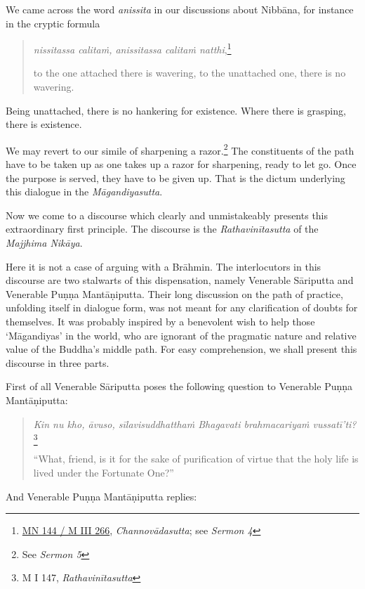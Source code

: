 We came across the word \emph{anissita} in our discussions about Nibbāna, for instance in the cryptic formula

\begin{quote}
\emph{nissitassa calitaṁ, anissitassa calitaṁ natthi},\footnote{\href{https://suttacentral.net/mn144/pli/ms}{MN 144 / M III 266}, \emph{Channovādasutta}; see \emph{Sermon 4}}

to the one attached there is wavering, to the unattached one, there is no wavering.
\end{quote}

Being unattached, there is no hankering for existence. Where there is grasping, there is existence.

We may revert to our simile of sharpening a razor.\footnote{See \emph{Sermon 5}} The constituents of the path have to be taken up as one takes up a razor for sharpening, ready to let go. Once the purpose is served, they have to be given up. That is the dictum underlying this dialogue in the \emph{Māgandiyasutta}.

Now we come to a discourse which clearly and unmistakeably presents this extraordinary first principle. The discourse is the \emph{Rathavinītasutta} of the \emph{Majjhima Nikāya}.

Here it is not a case of arguing with a Brāhmin. The interlocutors in this discourse are two stalwarts of this dispensation, namely Venerable Sāriputta and Venerable Puṇṇa Mantāṇiputta. Their long discussion on the path of practice, unfolding itself in dialogue form, was not meant for any clarification of doubts for themselves. It was probably inspired by a benevolent wish to help those `Māgandiyas' in the world, who are ignorant of the pragmatic nature and relative value of the Buddha's middle path. For easy comprehension, we shall present this discourse in three parts.

First of all Venerable Sāriputta poses the following question to Venerable Puṇṇa Mantāṇiputta:

\begin{quote}
\emph{Kin nu kho, āvuso, sīlavisuddhatthaṁ Bhagavati brahmacariyaṁ vussatī'ti?}\footnote{M I 147, \emph{Rathavinītasutta}}

``What, friend, is it for the sake of purification of virtue that the holy life is lived under the Fortunate One?''
\end{quote}

And Venerable Puṇṇa Mantāṇiputta replies:

